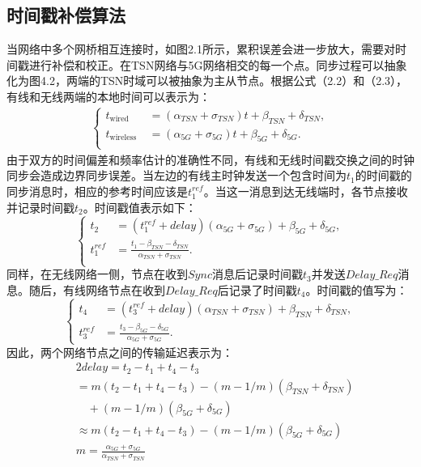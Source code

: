 \documentclass[UTF8,a4paper,12pt]{ctexart}
\numberwithin{equation}{section}
\begin{document}
\subsection{时间戳补偿算法}
当网络中多个网桥相互连接时，如图2.1所示，累积误差会进一步放大，需要对时间戳进行补偿和校正。在TSN网络与5G网络相交的每一个点。同步过程可以抽象化为图4.2，两端的TSN时域可以被抽象为主从节点。根据公式（2.2）和（2.3），有线和无线两端的本地时间可以表示为：
\begin{eqnarray}
	\left\{
	\begin{aligned}
		t_{\text {wired}}&=\left(\alpha_{TSN}+\sigma_{TSN}\right) t+\beta_{TSN}+\delta_{TSN},\\
		t_{\text {wireless }}&=\left(\alpha_{5G}+\sigma_{5G}\right) t+\beta_{5G}+\delta_{5G}.\\
	\end{aligned}
	\right.
\end{eqnarray}
由于双方的时间偏差和频率估计的准确性不同，有线和无线时间戳交换之间的时钟同步会造成边界同步误差。当左边的有线主时钟发送一个包含时间为$t_1$的时间戳的同步消息时，相应的参考时间应该是$t_1^{ref}$。当这一消息到达无线端时，各节点接收并记录时间戳$t_2$。时间戳值表示如下：
\begin{equation}
	\left\{
	\begin{aligned}
		t_{2}&=(t_1^{ref}+delay)(\alpha_{5G}+\sigma_{5G})+\beta_{5G}+\delta_{5G},\\
		t_1^{ref}&=\frac{t_{1}-\beta_{TSN}-\delta_{TSN}}{\alpha_{TSN}+\sigma_{TSN}}.\\
	\end{aligned}
	\right.	
\end{equation}
同样，在无线网络一侧，节点在收到$Sync$消息后记录时间戳$t_3$并发送$Delay\_Req$消息。随后，有线网络节点在收到$Delay\_Req$后记录了时间戳$t_4$。时间戳的值写为：
\begin{equation}
	\left\{
	\begin{aligned}
		t_{4}&=(t_3^{ref}+delay)(\alpha_{TSN}+\sigma_{TSN})+\beta_{TSN}+\delta_{TSN},\\
		t_3^{ref}&=\frac{t_{3}-\beta_{5G}-\delta_{5G}}{\alpha_{5G}+\sigma_{5G}}.
	\end{aligned}
	\right.	
\end{equation}
因此，两个网络节点之间的传输延迟表示为：
\begin{equation}
	\begin{split}
		&2  delay =t_{2}-t_{1}+t_{4}-t_{3} \\
		&=m\left(t_{2}-t_{1}+t_{4}-t_{3}\right)-(m-1 / m)\left(\beta_{TSN}+\delta_{TSN}\right)\\
		&\quad+(m-1 / m)\left(\beta_{5G}+\delta_{5G}\right)\\
		& \approx m\left(t_{2}-t_{1}+t_{4}-t_{3}\right)-(m-1 / m)\left(\beta_{5G}+\delta_{5G}\right)\\
		&m=\frac{\alpha_{5G}+\sigma_{5G}}{\alpha_{TSN}+\sigma_{TSN}}		
	\end{split}
\end{equation}
\end{document}
